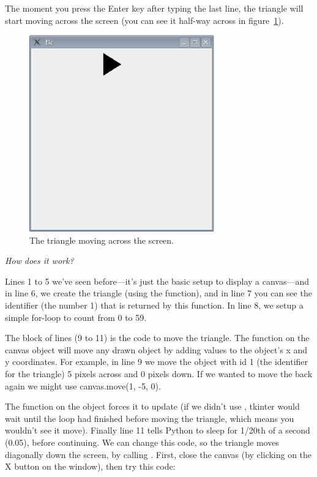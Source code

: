 The moment you press the Enter key after typing the last line, the triangle will start moving across the screen (you can see it half-way across in figure~\ref{fig44}).

\begin{figure}
\begin{center}
\includegraphics[width=80mm]{eps/figure44.eps}
\end{center}
\caption{The triangle moving across the screen.}\label{fig44}
\end{figure}

\par
\emph{How does it work?}
\par
Lines 1 to 5 we've seen before---it's just the basic setup to display a canvas---and in line 6, we create the triangle (using the  function), and in line 7 you can see the identifier (the number 1) that is returned by this function. In line 8, we setup a simple for-loop to count from 0 to 59.

The block of lines (9 to 11) is the code to move the triangle. The  function on the canvas object will move any drawn object by adding values to the object's x and y coordinates. For example, in line 9 we move the object with id 1 (the identifier for the triangle) 5 pixels across and 0 pixels down. If we wanted to move the back again we might use canvas.move(1, -5, 0).
 
The function  on the  object forces it to update (if we didn't use , tkinter would wait until the loop had finished before moving the triangle, which means you wouldn't see it move). Finally line 11 tells Python to sleep for 1/20th of a second (0.05), before continuing. We can change this code, so the triangle moves diagonally down the screen, by calling .  First, close the canvas (by clicking on the X button on the window), then try this code:

